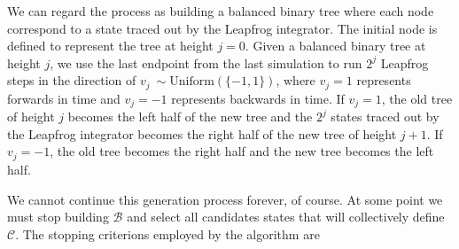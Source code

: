 We can regard the process as building a balanced binary tree where each node correspond to a state traced out by the Leapfrog integrator. The initial node is defined to represent the tree at height $j = 0$. Given a balanced binary tree at height $j$, we use the last endpoint from the last simulation to run $2^j$ Leapfrog steps in the direction of $v_j ~ \sim \text{Uniform}(\{-1, 1\})$, where $v_j = 1$ represents forwards in time and $v_j = -1$ represents backwards in time.
If $v_j = 1$, the old tree of height $j$ becomes the left half of the new tree and the $2^j$ states traced out by the Leapfrog integrator becomes the right half of the new tree of height $j + 1$. If $v_j = -1$, the old tree becomes the right half and the new tree becomes the left half. 

We cannot continue this generation process forever, of course. At some point we must stop building $\mathcal{B}$ and select all candidates states that will collectively define $\mathcal{C}$. The stopping criterions employed by the algorithm are
